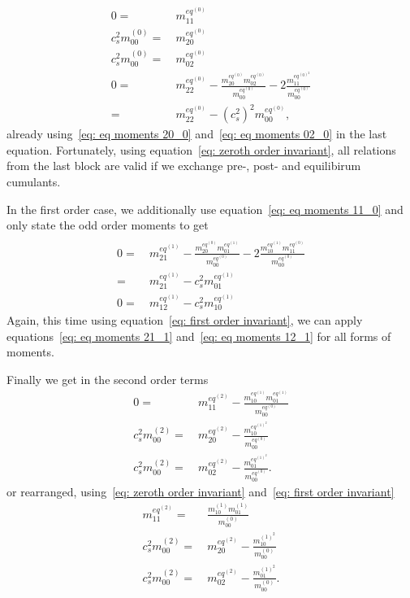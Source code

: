 \begin{align}
  \label{eq: eq moments 11_0}
  0 = &\ m_{11}^{eq^{(0)}}
  \\
  \label{eq: eq moments 20_0}
  c_s^2 m_{00}^{(0)} = &\ m_{20}^{eq^{(0)}}
  \\
  \label{eq: eq moments 02_0}
  c_s^2 m_{00}^{(0)} = &\ m_{02}^{eq^{(0)}}
  \\
  \label{eq: eq moments 22_0}
  0 = &\ m_{22}^{eq^{(0)}} - \frac{ m_{20}^{eq^{(0)}} m_{02}^{eq^{(0)}} }{m_{00}^{eq^{(0)}}} - 2\frac{ m_{11}^{eq^{{(0)}^2}}}{m_{00}^{eq^{(0)}}}
  \\ = &\ m_{22}^{eq^{(0)}} - {(c_s^2)}^2 m_{00}^{eq^{(0)}},
\end{align}
already using~\eqref{eq: eq moments 20_0} and~\eqref{eq: eq moments 02_0} in the last equation.
Fortunately, using equation~\eqref{eq: zeroth order invariant}, all relations from the last block are valid if we exchange pre-, post- and equilibirum cumulants.

In the first order case, we additionally use equation~\eqref{eq: eq moments 11_0} and only state the odd order moments to get
\begin{align}
  \\\nonumber
  0 = &\ m_{21}^{eq^{(1)}}
  - \frac{m_{20}^{eq^{(0)}} m_{01}^{eq^{(1)}}}{m_{00}^{eq^{(0)}}}
  - 2\frac{m_{10}^{eq^{(1)}} m_{11}^{eq^{(0)}}}{m_{00}^{eq^{(0)}}}
  \\
  \label{eq: eq moments 21_1}
  = &\ m_{21}^{eq^{(1)}}
  - c_s^2 m_{01}^{eq^{(1)}}
  \\
  \label{eq: eq moments 12_1}
  0 = &\ m_{12}^{eq^{(1)}}
  - c_s^2 m_{10}^{eq^{(1)}}
\end{align}
Again, this time using equation~\eqref{eq: first order invariant}, we can apply equations~\eqref{eq: eq moments 21_1} and~\eqref{eq: eq moments 12_1} for all forms of moments.

Finally we get in the second order terms
\begin{align}
    \label{eq: eq moments 11_2}
    0 =&\ m_{11}^{eq^{(2)}} - \frac{ m_{10}^{eq^{(1)}}m_{01}^{eq^{(1)}}}{m_{00}^{eq^{(0)}}}
    \\
    \label{eq: eq moments 20_2}
    c_s^2 m_{00}^{(2)} =&\ m_{20}^{eq^{(2)}} - \frac{ m_{10}^{eq^{{(1)}^2}}}{m_{00}^{eq^{(0)}}}
    \\
    \label{eq: eq moments 02_2}
    c_s^2 m_{00}^{(2)} =&\ m_{02}^{eq^{(2)}} - \frac{ m_{01}^{eq^{{(1)}^2}}}{m_{00}^{eq^{(0)}}} .
\end{align}
or rearranged, using~\eqref{eq: zeroth order invariant} and~\eqref{eq: first order invariant}
\begin{align}
    m_{11}^{eq^{(2)}} =&\  \frac{ m_{10}^{(1)}m_{01}^{(1)}}{m_{00}^{(0)}}
    \label{eq: eq moments 11_2 rearrange}
    \\
    c_s^2 m_{00}^{(2)} =&\ m_{20}^{eq^{(2)}} - \frac{ m_{10}^{{(1)}^2}}{m_{00}^{(0)}}
    \label{eq: eq moments 20_2 rearrange}
    \\
    \label{eq: eq moments 02_2 rearrange}
    c_s^2 m_{00}^{(2)} =&\ m_{02}^{eq^{(2)}} - \frac{ m_{01}^{{(1)}^2}}{m_{00}^{(0)}} .
\end{align}

